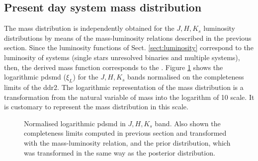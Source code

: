 \subsection{Present day system mass distribution}

The mass distribution is independently obtained for the $J,H,K_s$ luminosity distributions by means of the mass-luminosity relations described in the previous section. Since the luminosity functions of Sect. \ref{sect:luminosity} correspond to the luminosity of systems (single stars unresolved binaries and multiple systems), then, the derived mass function corresponds to the .  Figure \ref{fig:MassDistribution} shows the logarithmic \gls{pdsmd} ($\xi_L$) for the $J,H,K_s$ bands normalised on the completeness limits of the \gls{ddr2}. The logarithmic representation of the mass distribution is a transformation from the natural variable of mass into the logarithm of 10 scale. It is customary to represent the mass distribution in this scale.

\begin{figure}[htbp]
\begin{center}
\caption{Normalised logarithmic \gls{pdsmd} in $J,H,K_s$ band. Also shown the completeness limits computed in previous section and transformed with the mass-luminosity relation, and the prior distribution, which was transformed in the same way as the posterior distribution.}
\label{fig:MassDistribution}
\end{center}
\end{figure}

